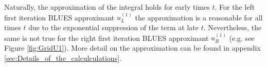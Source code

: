 \documentclass[amsmath,amssymb,amsfonts,aps,pre,preprint,superscriptaddress,bibnotes,showpacs,showkeys,longbibliography]{revtex4-1}
\begin{document}
Naturally, the approximation of the integral holds for early times $t$. For the left first iteration BLUES approximant $u^{(1)}_L$ the approximation is a reasonable for all times $t$ due to the exponential suppression of the term at late $t$. Nevertheless, the same is not true for the right first iteration BLUES approximant $u^{(1)}_R$ (e.g. see Figure \ref{fig:GridU1}). More detail on the approximation can be found in appendix \ref{sec:Details_of_the_calculculations}.
\end{document}
